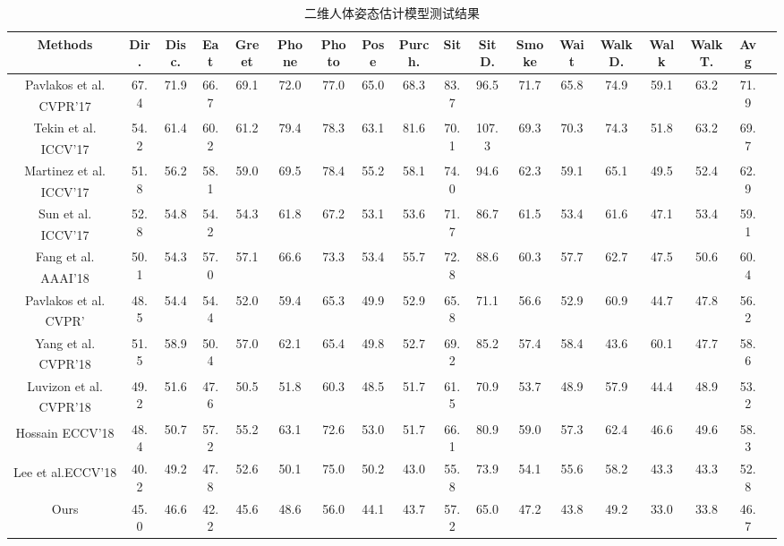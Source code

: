 \begin{table}[h]
    \caption{\label{tab:t3}二维人体姿态估计模型测试结果}
    \centering
    \begin{tabular}{c c c c c c c c c c c c c c c c c c}
        \toprule
		Methods  & Dir.   & Disc. & Eat   & Greet  & Phone  & Photo  & Pose  & Purch.  & Sit  & SitD.  & Smoke  & Wait  & WalkD.  & Walk  & WalkT.  & Avg   \\
        \midrule
        Pavlakos et al. CVPR’17\textsuperscript{\cite{p1}}     & 67.4  & 71.9  & 66.7  & 69.1  & 72.0  & 77.0  & 65.0  & 68.3  & 83.7  & 96.5  & 71.7  & 65.8  & 74.9  & 59.1  & 63.2  & 71.9  \\
		Tekin et al. ICCV’17\textsuperscript{\cite{p2}}        & 54.2  & 61.4  & 60.2  & 61.2  & 79.4  & 78.3  & 63.1  & 81.6  & 70.1  & 107.3 & 69.3  & 70.3  & 74.3  & 51.8  & 63.2  & 69.7  \\
		Martinez et al. ICCV’17\textsuperscript{\cite{p30}}    & 51.8  & 56.2  & 58.1  & 59.0  & 69.5  & 78.4  & 55.2  & 58.1  & 74.0  & 94.6  & 62.3  & 59.1  & 65.1  & 49.5  & 52.4  & 62.9  \\
		Sun et al. ICCV’17\textsuperscript{\cite{p3}}          & 52.8  & 54.8  & 54.2  & 54.3  & 61.8  & 67.2  & 53.1  & 53.6  & 71.7  & 86.7  & 61.5  & 53.4  & 61.6  & 47.1  & 53.4  & 59.1  \\
		Fang et al. AAAI’18\textsuperscript{\cite{p4}}         & 50.1  & 54.3  & 57.0  & 57.1  & 66.6  & 73.3  & 53.4  & 55.7  & 72.8  & 88.6  & 60.3  & 57.7  & 62.7  & 47.5  & 50.6  & 60.4  \\
		Pavlakos et al. CVPR’\textsuperscript{\cite{p5}}       & 48.5  & 54.4  & 54.4  & 52.0  & 59.4  & 65.3  & 49.9  & 52.9  & 65.8  & 71.1  & 56.6  & 52.9  & 60.9  & 44.7  & 47.8  & 56.2  \\
		Yang et al. CVPR’18\textsuperscript{\cite{p6}}         & 51.5  & 58.9  & 50.4  & 57.0  & 62.1  & 65.4  & 49.8  & 52.7  & 69.2  & 85.2  & 57.4  & 58.4  & 43.6  & 60.1  & 47.7  & 58.6  \\
		Luvizon et al. CVPR’18\textsuperscript{\cite{p7}}      & 49.2  & 51.6  & 47.6  & 50.5  & 51.8  & 60.3  & 48.5  & 51.7  & 61.5  & 70.9  & 53.7  & 48.9  & 57.9  & 44.4  & 48.9  & 53.2  \\
		Hossain  ECCV’18\textsuperscript{\cite{p8}}            & 48.4  & 50.7  & 57.2  & 55.2  & 63.1  & 72.6  & 53.0  & 51.7  & 66.1  & 80.9  & 59.0  & 57.3  & 62.4  & 46.6  & 49.6  & 58.3  \\
        Lee et al.ECCV’18\textsuperscript{\cite{p11}}  	       & 40.2  & 49.2  & 47.8  & 52.6  & 50.1  & 75.0  & 50.2  & 43.0  & 55.8  & 73.9  & 54.1  & 55.6  & 58.2  & 43.3  & 43.3  & 52.8 \\
		Ours                                                   & 45.0  & 46.6  & 42.2  & 45.6  & 48.6  & 56.0  & 44.1  & 43.7  & 57.2  & 65.0  & 47.2  & 43.8  & 49.2  & 33.0  & 33.8  & 46.7  \\
		\bottomrule
    \end{tabular}
\end{table}



